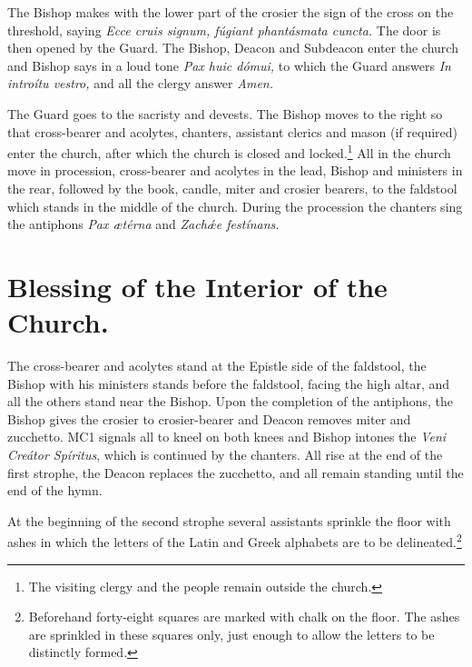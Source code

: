 \documentclass[letterpaper]{report}
\begin{document}
{    \rubric The Bishop makes with the lower part of the crosier the sign of the
    cross on the threshold, saying \textit{Ecce cru\cross is signum, f\'ugiant
    phant\'asmata cuncta.} The door is then opened by the Guard. The Bishop,
    Deacon and Subdeacon enter the church and Bishop says in a loud tone
    \textit{Pax huic d\'omui,} to which the Guard answers \textit{In introítu
    vestro,} and all the clergy answer \textit{Amen.}

    \rubric The Guard goes to the sacristy and devests. The Bishop moves to the
    right so that cross-bearer and acolytes, chanters, assistant clerics and
    mason (if required) enter the church, after which the church is closed and
    locked.\footnote{The visiting clergy and the people remain outside the
    church.} All in the church move in procession, cross-bearer and acolytes in
    the lead, Bishop and ministers in the rear, followed by the book, candle,
    miter and crosier bearers, to the faldstool which stands in the middle of
    the church. During the procession the chanters sing the antiphons
    \textit{Pax \ae t\'erna} and \textit{Zach\'\ae e fest\'inans.}

    \section{Blessing of the Interior of the Church.}

    \rubric The cross-bearer and acolytes stand at the Epistle side of the
    faldstool, the Bishop with his ministers stands
    before the faldstool, facing the high altar, and all the others stand near
    the Bishop. Upon the completion of the antiphons, the Bishop gives the
    crosier to crosier-bearer and Deacon removes miter and zucchetto. MC1
    signals all to kneel on both knees and Bishop intones the \textit{Veni
    Cre\'ator Sp\'iritus}, which is continued by the chanters. All rise at the
    end of the first strophe, the Deacon replaces the zucchetto, and all remain
    standing until the end of the hymn.

    \rubric At the beginning of the second strophe several assistants sprinkle
    the floor with ashes in which the letters of the Latin and Greek alphabets
    are to be delineated.\footnote{Beforehand forty-eight squares are marked
    with chalk on the floor. The ashes are sprinkled in these squares only,
    just enough to allow the letters to be distinctly formed.}

}
\end{document}
